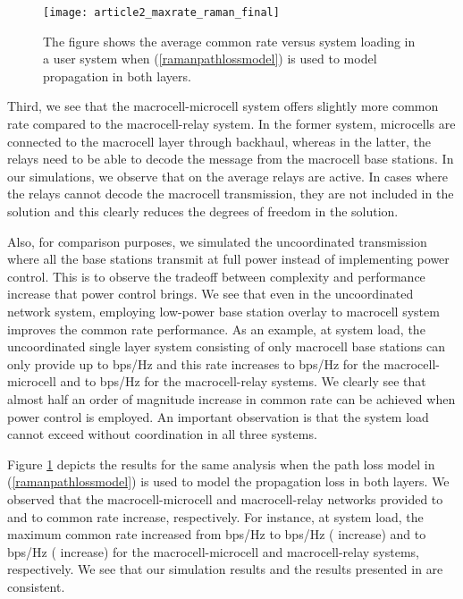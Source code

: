 \documentclass[conference,letterpaper,final,10pt]{IEEEtran}
\begin{document}
\begin{figure}[tb!]\begin{center}
  \texttt{[image: article2\_maxrate\_raman\_final]}\caption{The figure shows the average common rate versus system loading in a  user system when (\ref{ramanpathlossmodel}) is used to model propagation in both layers.}\label{ramanrate}\end{center}
\end{figure}

Third, we see that the macrocell-microcell system offers slightly more common rate compared to the macrocell-relay system. In the former system, microcells are connected to the macrocell layer through backhaul, whereas in the latter, the relays need to be able to decode the message from the macrocell base stations. In our simulations, we observe that on the average  relays are active. In cases where the relays cannot decode the macrocell transmission, they are not included in the solution and this clearly reduces the degrees of freedom in the solution.

Also, for comparison purposes, we simulated the uncoordinated transmission where all the base stations transmit at full power instead of implementing power control. This is to observe the tradeoff between complexity and performance increase that power control brings. We see that even in the uncoordinated network system, employing low-power base station overlay to macrocell system improves the common rate performance. As an example, at  system load, the uncoordinated single layer system consisting of only macrocell base stations can only provide up to  bps/Hz and this rate increases to  bps/Hz for the macrocell-microcell and to  bps/Hz for the macrocell-relay systems. We clearly see that almost half an order of magnitude increase in common rate can be achieved when power control is employed. An important observation is that the system load cannot exceed  without coordination in all three systems.

Figure \ref{ramanrate} depicts the results for the same analysis when the path loss model in (\ref{ramanpathlossmodel}) is used to model the propagation loss in both layers. We observed that the macrocell-microcell and macrocell-relay networks provided  to  and  to  common rate increase, respectively. For instance, at  system load, the maximum common rate increased from  bps/Hz to  bps/Hz ( increase) and to  bps/Hz ( increase) for the macrocell-microcell and macrocell-relay systems, respectively. We see that our simulation results and the results presented in \cite{RamanConf} are consistent.
\end{document}
